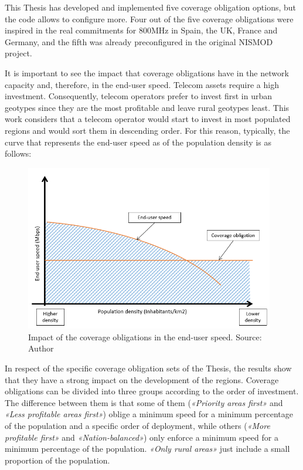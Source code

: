 This Thesis has developed and implemented five coverage obligation options, but the code allows to configure more. Four out of the five coverage obligations were inspired in the real commitments for 800MHz in Spain, the UK, France and Germany, and the fifth was already preconfigured in the original NISMOD project. \par

It is important to see the impact that coverage obligations have in the network capacity and, therefore, in the end-user speed. Telecom assets require a high investment. Consequently, telecom operators prefer to invest first in urban geotypes since they are the most profitable and leave rural geotypes least. This work considers that a telecom operator would start to invest in most populated regions and would sort them in descending order. For this reason, typically, the curve that represents the end-user speed as of the population density is as follows:\par



\begin{figure}[H]
	\begin{Center}
		\includegraphics[width=4.29in,height=2.86in]{./media/image103.png}
		\caption{Impact of the coverage obligations in the end-user speed. Source: Author}
	\end{Center}
\end{figure}





In respect of the specific coverage obligation sets of the Thesis, the results show that they have a strong impact on the development of the regions. Coverage obligations can be divided into three groups according to the order of investment. The difference between them is that some of them (\textit{«Priority areas first»} and\textit{ «Less profitable areas first»}) oblige a minimum speed for a minimum percentage of the population and a specific order of deployment, while others (\textit{«More profitable first»} and \textit{«Nation-balanced»}) only enforce a minimum speed for a minimum percentage of the population.\textit{ «Only rural areas»} just include a small proportion of the population.\par


